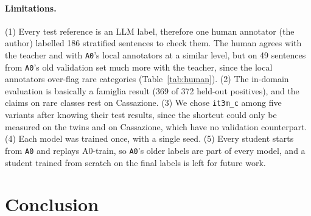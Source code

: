 \documentclass[11pt]{article}
\begin{document}
\paragraph{Limitations.} (1) Every test reference is an LLM label, therefore one human annotator (the author) labelled 186 stratified sentences to check them. The human agrees with the teacher and with \texttt{A0}'s local annotators at a similar level, but on 49 sentences from \texttt{A0}'s old validation set much more with the teacher, since the local annotators over-flag rare categories (Table~\ref{tab:human}). (2) The in-domain evaluation is basically a famiglia result (369 of 372 held-out positives), and the claims on rare classes rest on Cassazione. (3) We chose \texttt{it3m\_c} among five variants after knowing their test results, since the shortcut could only be measured on the twins and on Cassazione, which have no validation counterpart. (4) Each model was trained once, with a single seed. (5) Every student starts from \texttt{A0} and replays A0-train, so \texttt{A0}'s older labels are part of every model, and a student trained from scratch on the final labels is left for future work.


\section{Conclusion}
\label{sec:conclusion}
\end{document}
